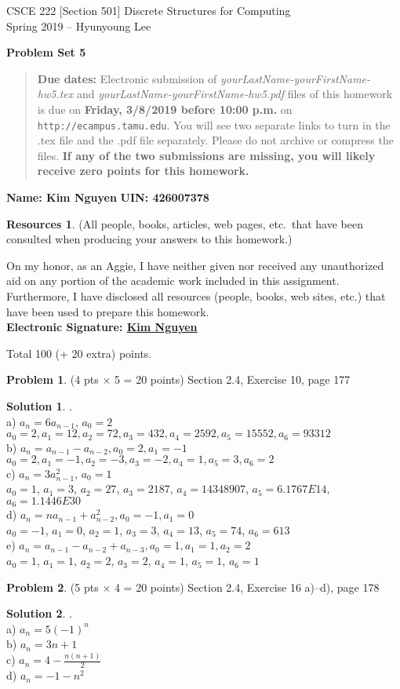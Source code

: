\documentclass{article}
\theoremstyle{definition}
\newtheorem{problem}{Problem}
\newtheorem*{solution}{Solution}
\newtheorem*{resources}{Resources}
\newcommand{\name}[2]{\noindent\textbf{Name: #1}\hfill \textbf{UIN: #2}}
\newcommand{\honor}{\noindent On my honor, as an Aggie, I have neither
  given nor received any unauthorized aid on any portion of the
  academic work included in this assignment. Furthermore, I have
  disclosed all resources (people, books, web sites, etc.) that have
  been used to prepare this homework. \\[2ex]
 \textbf{Electronic Signature: \underline{ Kim Nguyen } } }
\newcommand{\problemset}[1]{\begin{center}\textbf{Problem Set #1}\end{center}}
\newcommand{\duedate}[1]{\begin{quote}\textbf{Due dates:} Electronic
    submission of \textsl{yourLastName-yourFirstName-hw5.tex} and 
    \textsl{yourLastName-yourFirstName-hw5.pdf} files of this homework is due on
    \textbf{#1} on \texttt{http://ecampus.tamu.edu}. You will see two separate links
    to turn in the .tex file and the .pdf file separately. Please do not archive or compress the files.  
    \textbf{If any of the two submissions are missing, you will likely receive zero points for this 
    homework.}\end{quote} }
\begin{document}
\vspace*{-15mm}
\begin{center}
{\large
CSCE 222 [Section 501] Discrete Structures for Computing\\[.5ex]
Spring 2019 -- Hyunyoung Lee\\}
\end{center}
\problemset{5}
\duedate{Friday, 3/8/2019 before 10:00 p.m.}
\name{ Kim Nguyen }{ 426007378 }
\begin{resources} (All people, books, articles, web pages, etc.\ that
  have been consulted when producing your answers to this homework.)
\end{resources}
\honor

\bigskip
\noindent
Total 100 (+ 20 extra) points.

\begin{problem} (4 pts $\times$ 5 = 20 points) 
Section 2.4, Exercise 10, page 177
\end{problem}
\begin{solution}.
\\a) $a_n = 6{a}_{n-1}$, $a_0 = 2$
\\$a_0 = 2, a_1 = 12, a_2 = 72, a_3 = 432, a_4 = 2592, a_5 = 15552, a_6 = 93312$
\\b) $a_n = a_{n-1} - a_{n-2} , a_0 = 2, a_1 = -1$
\\$a_0 = 2, a_1 = -1, a_2 = -3, a_3 = -2, a_4 = 1, a_5 = 3, a_6 = 2$
\\c) $a_n = 3a^{2}_{n-1}$, $a_0 = 1$ 
\\$a_0 = 1$, $a_1 = 3$, $a_2 = 27$, $a_3 = 2187$, $a_4 = 14348907$, $a_5 = 6.1767E14$, $a_6 = 1.1446E30$
\\d) $a_n = na_{n-1} + a_{n-2}^{2}, a_0 = -1, a_1 = 0$
\\$a_0 = -1$, $a_1 = 0$, $a_2 = 1$, $a_3 = 3$, $a_4 = 13$, $a_5 = 74$, $a_6 = 613$
\\e) $a_n = a_{n-1} - a_{n-2} + a_{n-3}, a_0 = 1, a_1 = 1, a_2 = 2$
\\$a_0 = 1$, $a_1 = 1$, $a_2 = 2$, $a_3 = 2$, $a_4 = 1$, $a_5 = 1$, $a_6 = 1$
\end{solution}

\begin{problem} (5 pts $\times$ 4 = 20 points) 
Section 2.4, Exercise 16 a)--d), page 178
\end{problem}
\begin{solution}.
\\a) $a_n = 5(-1)^n$
\\b) $a_n = 3n + 1$
\\c) $a_n = 4 - \frac{n(n+1)}{2}$
\\d) $a_n = -1 - n^2$
\end{solution}
\end{document}
